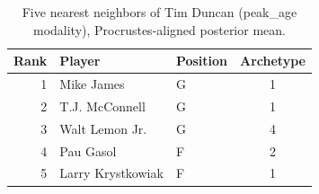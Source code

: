 \begin{table}[htbp]
  \centering\small
  \begin{tabular}{rllc}
    \toprule
    Rank & Player & Position & Archetype \\
    \midrule
    1 & Mike James & G & 1 \\
    2 & T.J. McConnell & G & 1 \\
    3 & Walt Lemon Jr. & G & 4 \\
    4 & Pau Gasol & F & 2 \\
    5 & Larry Krystkowiak & F & 1 \\
    \bottomrule
  \end{tabular}
  \caption{Five nearest neighbors of Tim Duncan (peak_age modality), Procrustes-aligned posterior mean.}
  \label{tab:Tim_Duncan_neighbors_peak_age}
\end{table}

